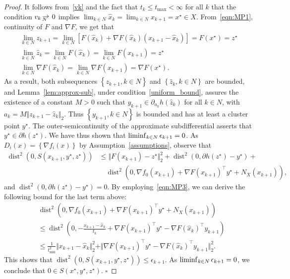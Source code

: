 \documentclass[smallextended,envcountsect]{svjour3}
\newcommand{\norm}[1]{\textstyle{\Vert} #1 \textstyle{\Vert}_2}
\newcommand{\col}[1]{\left\{#1\right\}}
\newcommand{\mybox}{{\hfill $\square$}}
\newcommand{\nliminf}{\mathop{\rm liminf}\nolimits}
\DeclareMathOperator{\dist}{dist}
\def\Nto{\,{\raise 1pt\hbox{$\rightarrow$}}\kern -12pt
     \hbox{\lower 3pt \hbox{$\, \scriptstyle N$}}\hskip7pt}
\begin{document}
\begin{proof}
It follows from~\eqref{vk} and the fact that $t_k\leq t_{\max}<\infty$ for all $k$ that the condition $v_k \Nto 0$
implies $\lim_{k \in N} \hat x_{k} =  \lim_{k \in N} x_{k+1}= x^\star \in X$.
From~\eqref{eqn:MP1}, continuity of $F$ and $\nabla F$, we get that
\begin{align*}
\lim_{k \in N} z_{k+1}=\lim_{k \in N} [F(\hat x_k)+\nabla F(\hat x_k) (x_{k+1}-\hat x_k)] = F(x^\star) = z^\star\\
\lim_{k \in N} \hat z_{k}=\lim_{k \in N} F(\hat x_k)=\lim_{k \in N} F( x_{k+1})  = z^\star\\
\lim_{k \in N} \nabla F(\hat x_k)=\lim_{k \in N} \nabla F(x_{k+1}) = \nabla F(x^\star).
\end{align*}
As a result, both subsequences $\col{z_{k+1}, k \in N}$ and $\col{\hat z_{k}, k \in N}$ are bounded, and Lemma~\ref{lem:approx-sub}, under condition~\eqref{uniform_bound}, assures the existence of a constant $M>0$ such that $y_{k+1}\in \partial_{a_k} h(\hat z_{k})$ for all $k \in N$, with $a_k=M\norm{z_{k+1}-\hat z_k}$. Thus $\col{y_{k+1}, k\in N}$ is bounded and has at least a cluster point $y^\star$. The outer-semicontinuity of the approximate subdifferential asserts that  $y^\star \in  \partial h(z^\star)$. We have thus shown that  $\nliminf_{k\in N} \epsilon_{k+1}=0$.
As $D_i(x)=\col{\nabla f_i(x)}$ by Assumption~\ref{assumptions}, observe that
\begin{align*}
\dist^2(0, S(x_{k+1},y^\star,z^\star)) &
\leq \norm{F(x_{k+1})- z^\star}^2 + \dist^2(0,\partial h(z^\star) - y^\star) +\\
&\quad \dist^2(0,\nabla f_0(x_{k+1})+ \nabla F(x_{k+1})^\top  y^\star  + N_X( x_{k+1})),
\end{align*}
and $\dist^2(0,\partial h( z^\star) -y^\star) =0$. By employing~\eqref{eqn:MP3}, we can derive the following bound for the last term above:
\begin{align*}
 & \dist^2(0,\nabla f_0(x_{k+1})+ \nabla F(x_{k+1})^\top  y^\star  + N_X( x_{k+1})) \\
 &\leq \dist^2(0, -\frac{x_{k+1}-\hat x_k}{t_k}+\nabla F(x_{k+1})^\top  y^\star - \nabla F(\hat x_{k})^\top  y_{k+1}  ) \\
 &\leq \frac{1}{t_{\min}^2}\norm{x_{k+1}-\hat x_k}^2 + \norm{\nabla F(x_{k+1})^\top  y^\star - \nabla F(\hat x_{k})^\top  y_{k+1} }^2.
\end{align*}
This shows that $\dist^2(0, S(x_{k+1}, y^\star, z^\star)) \leq \epsilon_{k+1}$.
As $\nliminf_{k\in N} \epsilon_{k+1}=0$, we conclude that $0 \in S(x^\star, y^\star, z^\star)$.
\mybox
\end{proof}
\end{document}
